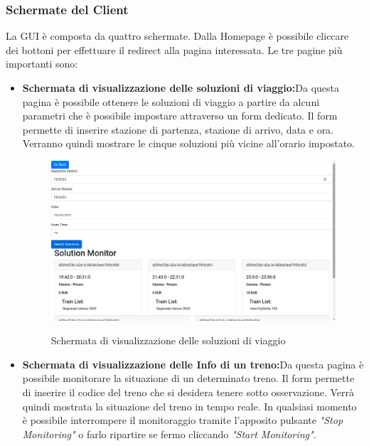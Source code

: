 \subsubsection{Schermate del Client}
La GUI è composta da quattro schermate. Dalla Homepage è possibile cliccare dei bottoni per effettuare il redirect alla pagina interessata.\newline
Le tre pagine più importanti sono:
\begin{itemize}
    \item \textbf{Schermata di visualizzazione delle soluzioni di viaggio:}\newline Da questa pagina è possibile ottenere le soluzioni di viaggio a partire da alcuni parametri che è possibile impostare attraverso un form dedicato.\newline
    Il form permette di inserire stazione di partenza, stazione di arrivo, data e ora. Verranno quindi mostrare le cinque soluzioni più vicine all'orario impostato.
    \begin{figure}[H]
        \caption{Schermata di visualizzazione delle soluzioni di viaggio}
        \centering
        \includegraphics[width=150mm]{img/screenshot/solutions.png}
        \label{fig:solutions}
    \end{figure}
    \item \textbf{Schermata di visualizzazione delle Info di un treno:}\newline Da questa pagina è possibile monitorare la situazione di un determinato treno.\newline
    Il form permette di inserire il codice del treno che si desidera tenere sotto osservazione.
    Verrà quindi mostrata la situazione del treno in tempo reale.\newline
    In qualsiasi momento è possibile interrompere il monitoraggio tramite l'apposito pulsante \textit{"Stop Monitoring"} o farlo ripartire se fermo cliccando \textit{"Start Monitoring"}.

\end{itemize}
